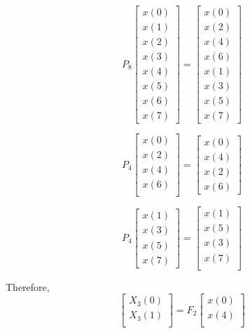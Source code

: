 \documentclass[journal,12pt,twocolumn]{IEEEtran}
\renewcommand\thesection{\arabic{section}}
\begin{document}
\begin{enumerate}[label=\arabic*.,ref=\thesection.\theenumi]
\begin{equation}
P_{8}
\begin{bmatrix}
x(0) \\ 
x(1) \\ 
x(2) \\ 
x(3) \\ 
x(4) \\ 
x(5) \\
x(6) \\
x(7)
\end{bmatrix}
 = 
\begin{bmatrix}
x(0) \\ 
x(2) \\ 
x(4) \\ 
x(6) \\
x(1) \\ 
x(3) \\ 
x(5) \\
x(7)
\end{bmatrix}
\end{equation}

\begin{equation}
P_{4}
\begin{bmatrix}
x(0) \\ 
x(2) \\ 
x(4) \\ 
x(6) \\
\end{bmatrix}
 = 
\begin{bmatrix}
x(0) \\ 
x(4) \\ 
x(2) \\
x(6)
\end{bmatrix}
\end{equation}

\begin{equation}
P_{4}
\begin{bmatrix}
x(1) \\ 
x(3) \\ 
x(5) \\
x(7)
\end{bmatrix}
 = 
\begin{bmatrix}
x(1) \\ 
x(5) \\ 
x(3) \\ 
x(7) \\
\end{bmatrix}
\end{equation}

Therefore,
\begin{equation}
\begin{bmatrix}
X_{3}(0) \\ 
X_{3}(1)\\ 
\end{bmatrix}
= F_{2}
\begin{bmatrix}
x(0) \\ 
x(4) \\ 
\end{bmatrix}
\end{equation}


\end{enumerate}
\end{document}
